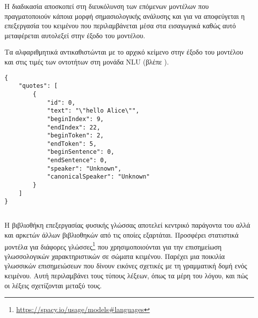 Η διαδικασία αποσκοπεί στη διευκόλυνση των επόμενων μοντέλων που πραγματοποιούν κάποια μορφή σημασιολογικής ανάλυσης
και για να αποφεύγεται η επεξεργασία του κειμένου που περιλαμβάνεται μέσα στα εισαγωγικά καθώς αυτό μεταφέρεται αυτολεξεί στην έξοδο του μοντέλου.

Τα αλφαριθμητικά \QUOTESTRING{} αντικαθιστώνται με το αρχικό κείμενο στην έξοδο του μοντέλου και στις τιμές των οντοτήτων στη μονάδα NLU (βλέπε ).

\begin{code}
    \begin{verbatim}
{
    "quotes": [
        {
            "id": 0,
            "text": "\"hello Alice\"",
            "beginIndex": 9,
            "endIndex": 22,
            "beginToken": 2,
            "endToken": 5,
            "beginSentence": 0,
            "endSentence": 0,
            "speaker": "Unknown",
            "canonicalSpeaker": "Unknown"
        }
    ]
}
    \end{verbatim}
\end{code}

\subsection{}\label{subsec:4-spacy}
Η βιβλιοθήκη επεξεργασίας φυσικής γλώσσας  αποτελεί κεντρικό παράγοντα του \projectname{} αλλά και αρκετών άλλων βιβλιοθηκών από τις οποίες εξαρτάται.
Προσφέρει στατιστικά μοντέλα για διάφορες γλώσσες\footnote{\url{https://spacy.io/usage/models\#languages}} που χρησιμοποιούνται για την επισημείωση γλωσσολογικών χαρακτηριστικών σε σώματα κειμένου.
Παρέχει μια ποικιλία γλωσσικών επισημειώσεων που δίνουν εικόνες σχετικές με τη γραμματική δομή ενός κειμένου.
Αυτή περιλαμβάνει τους τύπους λέξεων, όπως τα μέρη του λόγου, και πώς οι λέξεις σχετίζονται μεταξύ τους.

